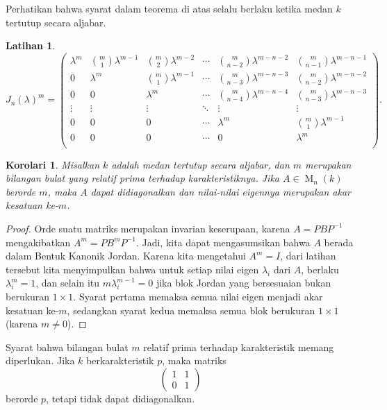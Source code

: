 \documentclass[12pt]{article}
\theoremstyle{plain}
\newtheorem{corollary}[theorem]{Korolari}
\newtheorem{exercise}[theorem]{Latihan}
\theoremstyle{definition}
\theoremstyle{remark}
\numberwithin{equation}{section}
\begin{document}
Perhatikan bahwa syarat dalam teorema di atas selalu berlaku ketika
medan $k$ tertutup secara aljabar.

\begin{exercise}
\[J_n(\lambda)^m =
\begin{pmatrix}
\lambda^m & \binom{m}{1}\lambda^{m-1} & \binom{m}{2}\lambda^{m-2}
& \cdots & \binom{m}{n-2}\lambda^{m-n-2} & \binom{m}{n-1}\lambda^{m-n-1}\\
0 & \lambda^m & \binom{m}{1}\lambda^{m-1}
& \cdots & \binom{m}{n-3}\lambda^{m-n-3} & \binom{m}{n-2}\lambda^{m-n-2}\\
0 & 0 & \lambda^m & \cdots &
\binom{m}{n-4}\lambda^{m-n-4} & \binom{m}{n-3}\lambda^{m-n-3}\\
\vdots & \vdots & \vdots & \ddots & \vdots & \vdots \\
0 & 0 & 0 & \cdots & \lambda^m & \binom{m}{1}\lambda^{m-1}\\
0 & 0 & 0 & \cdots & 0 & \lambda^m\\
 \end{pmatrix} .\]
\end{exercise}

\begin{corollary}
Misalkan $k$ adalah medan tertutup secara aljabar,
dan $m$ merupakan bilangan bulat yang relatif prima terhadap karakteristiknya.
Jika $A \in \operatorname{M}_n(k)$ berorde $m$,
maka $A$ dapat didiagonalkan dan nilai-nilai eigennya merupakan akar kesatuan ke-$m$.
\end{corollary}

\begin{proof}
Orde suatu matriks merupakan invarian keserupaan, karena
$A=PBP^{-1}$ mengakibatkan $A^m=PB^mP^{-1}$.
Jadi, kita dapat mengasumsikan bahwa $A$ berada dalam Bentuk Kanonik Jordan.
Karena kita mengetahui $A^m=I$, dari latihan tersebut kita menyimpulkan bahwa
untuk setiap nilai eigen $\lambda_i$ dari $A$, berlaku
$\lambda_i^m = 1$,
dan selain itu $m\lambda_i^{m-1}=0$ jika blok Jordan yang bersesuaian
bukan berukuran $1\times 1$.
Syarat pertama memaksa semua nilai eigen menjadi akar kesatuan ke-$m$,
sedangkan syarat kedua memaksa semua blok berukuran $1 \times 1$
(karena $m\ne 0$).
\end{proof}

Syarat bahwa bilangan bulat $m$ relatif prima terhadap karakteristik
memang diperlukan. Jika $k$ berkarakteristik $p$, maka matriks
\[
\begin{pmatrix} 1 & 1 \\ 0 & 1 \end{pmatrix} 
\]
berorde $p$, tetapi tidak dapat didiagonalkan. 
\end{document}
